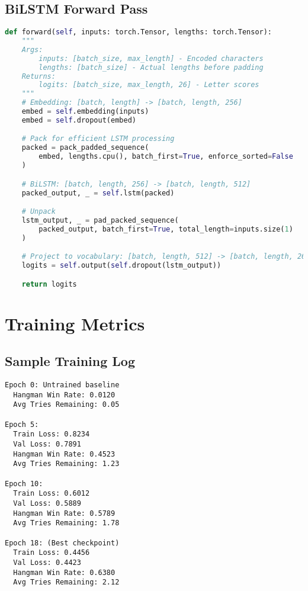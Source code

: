 \documentclass[12pt,a4paper]{article}
\begin{document}
\subsection{BiLSTM Forward Pass}

\begin{lstlisting}[language=Python, caption={BiLSTM Forward Pass Implementation}]
def forward(self, inputs: torch.Tensor, lengths: torch.Tensor):
    """
    Args:
        inputs: [batch_size, max_length] - Encoded characters
        lengths: [batch_size] - Actual lengths before padding
    Returns:
        logits: [batch_size, max_length, 26] - Letter scores
    """
    # Embedding: [batch, length] -> [batch, length, 256]
    embed = self.embedding(inputs)
    embed = self.dropout(embed)

    # Pack for efficient LSTM processing
    packed = pack_padded_sequence(
        embed, lengths.cpu(), batch_first=True, enforce_sorted=False
    )

    # BiLSTM: [batch, length, 256] -> [batch, length, 512]
    packed_output, _ = self.lstm(packed)

    # Unpack
    lstm_output, _ = pad_packed_sequence(
        packed_output, batch_first=True, total_length=inputs.size(1)
    )

    # Project to vocabulary: [batch, length, 512] -> [batch, length, 26]
    logits = self.output(self.dropout(lstm_output))

    return logits
\end{lstlisting}

\section{Training Metrics}

\subsection{Sample Training Log}

\begin{verbatim}
Epoch 0: Untrained baseline
  Hangman Win Rate: 0.0120
  Avg Tries Remaining: 0.05

Epoch 5:
  Train Loss: 0.8234
  Val Loss: 0.7891
  Hangman Win Rate: 0.4523
  Avg Tries Remaining: 1.23

Epoch 10:
  Train Loss: 0.6012
  Val Loss: 0.5889
  Hangman Win Rate: 0.5789
  Avg Tries Remaining: 1.78

Epoch 18: (Best checkpoint)
  Train Loss: 0.4456
  Val Loss: 0.4423
  Hangman Win Rate: 0.6380
  Avg Tries Remaining: 2.12
\end{verbatim}
\end{document}
